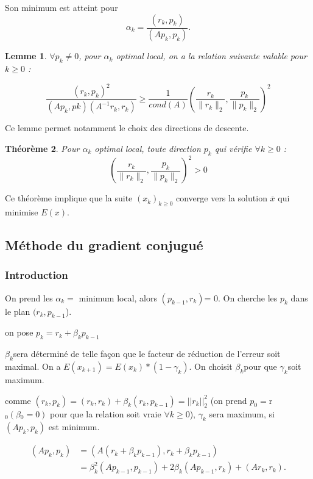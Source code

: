 \documentclass[12,french]{report}
\newtheorem{theorem}{Théorème}[chapter]
\newtheorem{lemma}[theorem]{Lemme}
\begin{document}
Son minimum est atteint pour
$$\alpha_{k}=\frac{(r_{k},p_{k})}{(Ap_{k},p_{k})}.$$



\begin{lemma}
	$\forall p_{k}\neq0$, pour $\alpha_{k}$ optimal local, on a la relation suivante valable pour $k\geq0$ :
	
$$\frac{(r_{k},p_{k})^{2}}{(Ap_{k},p{k})(A^{-1}r_{k},r_{k})}\geq\frac{1}{cond(A)}\left(\frac{r_{k}}{\|r_{k}\|_{2}},\frac{p_{k}}{\|p_{k}\|_{2}}\right)^{2}$$
\end{lemma}
Ce lemme permet notamment le choix des directions de descente.

\begin{theorem}
Pour $\alpha_{k}$ optimal local, toute direction $p_{k}$ qui vérifie $\forall k\geq0$ :
$$\left(\frac{r_{k}}{\|r_{k}\|_{2}},\frac{p_{k}}{\|p_{k}\|_{2}}\right)^{2}>0$$
\end{theorem}
Ce théorème implique que la suite $(x_{k})_{k\geq0}$ converge vers la solution $\overline{x}$ qui minimise $E(x)$.

\subsection{Méthode du gradient conjugué}
\subsubsection{Introduction}

On prend les $\alpha_{k}=$ minimum local, alors $(p_{k-1},r_{k})$=
0. On cherche les $p_{k}$ dans le plan $(r_{k},p_{k-1}$).

on pose $p_{k}=r_{k}+\beta_{k}p_{k-1}$

$\beta_{k}$sera déterminé de telle façon que le facteur de réduction
de l'erreur soit maximal. On a $E(x_{k+1})=E(x_{k})*(1-\gamma_{k}).$
On choisit $\beta_{k}$pour que $\gamma_{k}$soit maximum.

comme $(r_{k},p_{k})=(r_{k},r_{k})+\beta_{k}(r_{k},p_{k-1})=||r_{k}||_{2}^{2}$ (on
prend $p_{0}=$r$_{0}(\beta{}_{0}=0)$ pour que la relation soit vraie
$\forall k\geq0$), $\gamma_{k}$ sera maximum, si $(Ap_{k},p_{k})$
est minimum.

\begin{align*}
	(Ap_{k},p_{k}) & =(A(r_{k}+\beta_{k}p_{k-1}),r_{k}+\beta_{k}p_{k-1})\\
	& =\beta_{k}^{2}(Ap_{k-1},p_{k-1})+2\beta_{k}(Ap_{k-1},r_{k})+(Ar_{k},r_{k}).
\end{align*}
\end{document}
